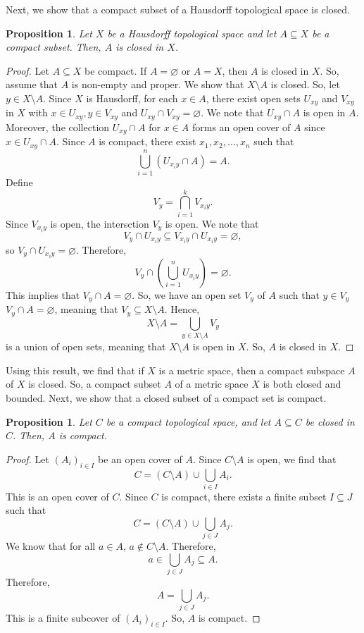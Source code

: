 \documentclass[a4paper, openany]{memoir}
\theoremstyle{definition}
\theoremstyle{plain}
\newtheorem{proposition}[definition]{Proposition}
\begin{document}
Next, we show that a compact subset of a Hausdorff topological space is closed.
\begin{proposition}
Let $X$ be a Hausdorff topological space and let $A \subseteq X$ be a compact subset. Then, $A$ is closed in $X$.
\end{proposition}
\begin{proof}
Let $A \subseteq X$ be compact. If $A = \varnothing$ or $A = X$, then $A$ is closed in $X$. So, assume that $A$ is non-empty and proper. We show that $X \setminus A$ is closed. So, let $y \in X \setminus A$. Since $X$ is Hausdorff, for each $x \in A$, there exist open sets $U_{xy}$ and $V_{xy}$ in $X$ with $x \in U_{xy}, y \in V_{xy}$ and $U_{xy} \cap V_{xy} = \varnothing$. We note that $U_{xy} \cap A$ is open in $A$. Moreover, the collection $U_{xy} \cap A$ for $x \in A$ forms an open cover of $A$ since $x \in U_{xy} \cap A$. Since $A$ is compact, there exist $x_1, x_2, \dots, x_n$ such that 
\[\bigcup_{i=1}^n (U_{x_i y} \cap A) = A.\]
Define
\[V_y = \bigcap_{i=1}^k V_{x_i y}.\]
Since $V_{x_i y}$ is open, the intersction $V_y$ is open. We note that 
\[V_y \cap U_{x_i y} \subseteq V_{x_i y} \cap U_{x_i y} = \varnothing,\]
so $V_y \cap U_{x_i y} = \varnothing$. Therefore,
\[V_y \cap \left(\bigcup_{i=1}^n U_{x_i y}\right) = \varnothing.\]
This implies that $V_y \cap A = \varnothing$. So, we have an open set $V_y$ of $A$ such that $y \in V_y$ $V_y \cap A = \varnothing$, meaning that $V_y \subseteq X \setminus A$. Hence, 
\[X \setminus A = \bigcup_{y \in X \setminus A} V_y\]
is a union of open sets, meaning that $X \setminus A$ is open in $X$. So, $A$ is closed in $X$.
\end{proof}
Using this result, we find that if $X$ is a metric space, then a compact subspace $A$ of $X$ is closed. So, a compact subset $A$ of a metric space $X$ is both closed and bounded.
Next, we show that a closed subset of a compact set is compact.
\begin{proposition}
Let $C$ be a compact topological space, and let $A \subseteq C$ be closed in $C$. Then, $A$ is compact.
\end{proposition}
\begin{proof}
Let $(A_i)_{i \in I}$ be an open cover of $A$. Since $C \setminus A$ is open, we find that
\[C = (C \setminus A) \cup \bigcup_{i \in I} A_i.\]
This is an open cover of $C$. Since $C$ is compact, there exists a finite subset $I \subseteq J$ such that
\[C = (C \setminus A) \cup \bigcup_{j \in J} A_j.\]
We know that for all $a \in A$, $a \not\in C \setminus A$. Therefore, 
\[a \in \bigcup_{j \in J} A_j \subseteq A.\]
Therefore,
\[A = \bigcup_{j \in J} A_j.\]
This is a finite subcover of $(A_i)_{i \in I}$. So, $A$ is compact.
\end{proof}
\end{document}
